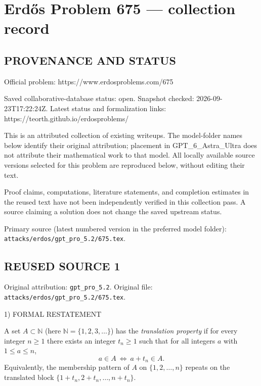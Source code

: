 \section*{Erd\H{o}s Problem 675 --- collection record}

\subsection*{PROVENANCE AND STATUS}
Official problem: https://www.erdosproblems.com/675

Saved collaborative-database status: open.
Snapshot checked: 2026-09-23T17:22:24Z.
Latest status and formalization links: https://teorth.github.io/erdosproblems/

This is an attributed collection of existing writeups. The model-folder names below identify their original attribution; placement in GPT\_6\_Astra\_Ultra does not attribute their mathematical work to that model. All locally available source versions selected for this problem are reproduced below, without editing their text.

Proof claims, computations, literature statements, and completion estimates in the reused text have not been independently verified in this collection pass. A source claiming a solution does not change the saved upstream status.

Primary source (latest numbered version in the preferred model folder): \texttt{attacks/erdos/gpt\_pro\_5.2/675.tex}.

\subsection*{REUSED SOURCE 1}
Original attribution: \texttt{gpt\_pro\_5.2}.
Original file: \texttt{attacks/erdos/gpt\_pro\_5.2/675.tex}.


1) FORMAL RESTATEMENT

A set $A\subset\mathbb N$ (here $\mathbb N=\{1,2,3,\dots\}$) has the \emph{translation property} if for every integer $n\ge 1$ there exists an integer $t_n\ge 1$ such that for all integers $a$ with $1\le a\le n$,
\[
 a\in A\ \Longleftrightarrow\ a+t_n\in A.
\]
Equivalently, the membership pattern of $A$ on $\{1,2,\dots,n\}$ repeats on the translated block $\{1+t_n,2+t_n,\dots,n+t_n\}$.

